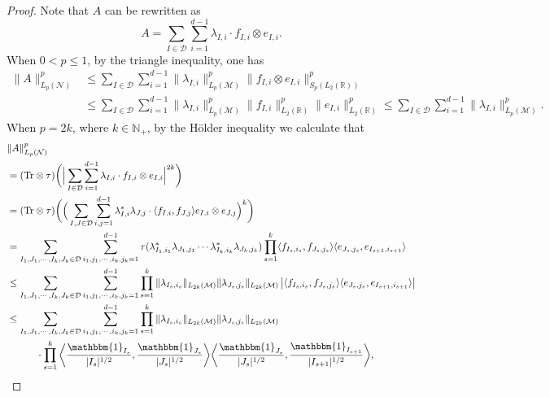 \documentclass[oneside,english,a4wide]{amsart}
\numberwithin{equation}{section}
\numberwithin{figure}{section}
\theoremstyle{plain}
\theoremstyle{plain}
\theoremstyle{definition}
\theoremstyle{plain}
\theoremstyle{remark}
\theoremstyle{definition}
\theoremstyle{remark}
\theoremstyle{definition}
\newcommand{\8}{\infty}
\begin{document}
\begin{proof}
	Note that $A$ can be rewritten as 
	$$A=\sum_{I\in \mathcal{D}}\sum_{i=1}^{d-1}\lambda_{I,i}\cdot f_{I,i}\otimes e_{I,i}. $$
	When $0<p\le 1$, by the triangle inequality, one has
	\begin{equation*}
		\begin{aligned}
			\|A\|^p_{L_p(\mathcal{N})}{}&\le \sum_{I\in\mathcal{D}}\sum_{i=1}^{d-1} \|\lambda_{I,i}\|^p_{L_p(\mathcal{M})}\|f_{I,i}\otimes e_{I,i}\|^p_{S_p(L_2(\mathbb{R}))}\\
			&\leq \sum_{I\in\mathcal{D}}\sum_{i=1}^{d-1} \|\lambda_{I,i}\|^p_{L_p(\mathcal{M})}\|f_{I,i}\|^p_{L_2(\mathbb{R})}\|e_{I,i}\|^p_{L_2(\mathbb{R})}\le\sum_{I\in\mathcal{D}}\sum_{i=1}^{d-1} \|\lambda_{I,i}\|^p_{L_p(\mathcal{M})}.
		\end{aligned}
	\end{equation*}
	When $p=2k$, where $k\in\mathbb{N}_+$, by the Hölder inequality we calculate that
	\begin{equation}\label{mp2}
		\begin{aligned}
			{}&\|A\|^p_{L_p(\mathcal{N})}\\
			&=(\mathrm{Tr}\otimes \tau) \biggl(\Big|\sum_{I\in\mathcal{D}}\sum_{i=1}^{d-1}\lambda_{I,i}\cdot f_{I,i}\otimes e_{I,i}\Big|^{2k}\biggr)\\
			&=(\mathrm{Tr}\otimes \tau) \biggl(\Big(\sum_{I,J\in\mathcal{D}}\sum_{i,j=1}^{d-1}\lambda_{I,i}^*\lambda_{J,j}\cdot \langle f_{I,i},f_{J,j}\rangle e_{I,i}\otimes e_{J,j}\Big)^{k}\biggr)\\
			&=\sum_{I_1,J_1,\cdots,I_k,J_k\in\mathcal{D}}\sum_{ i_1,j_1,\cdots,i_k,j_k=1}^{d-1} \tau(\lambda_{I_1,i_1}^*\lambda_{J_1,j_1}\cdots \lambda_{I_k,i_k}^*\lambda_{J_k,j_k}) \prod_{s=1}^k \langle f_{I_s,i_s},f_{J_s,j_s}\rangle \langle e_{J_s,j_s},e_{I_{s+1},i_{s+1}}\rangle\\
			&\le \sum_{I_1,J_1,\cdots,I_k,J_k\in\mathcal{D}} \sum_{ i_1,j_1,\cdots,i_k,j_k=1}^{d-1} \prod_{s=1}^k \|\lambda_{I_s,i_s}\|_{L_{2k}(\mathcal{M})}\|\lambda_{J_s,j_s}\|_{L_{2k}(\mathcal{M})}\left|\langle f_{I_s,i_s},f_{J_s,j_s}\rangle \langle e_{J_s,j_s},e_{I_{s+1},i_{s+1}}\rangle\right|\\
			&\leq \sum_{I_1,J_1,\cdots,I_k,J_k\in\mathcal{D}} \sum_{ i_1,j_1,\cdots,i_k,j_k=1}^{d-1} \prod_{s=1}^k \|\lambda_{I_s,i_s}\|_{L_{2k}(\mathcal{M})}\|\lambda_{J_s,j_s}\|_{L_{2k}(\mathcal{M})} \\
			&\quad\quad\quad\cdot\prod_{s=1}^k \bigg\langle \frac{\mathbbm{1}_{I_s}}{|I_s|^{1/2}},\frac{\mathbbm{1}_{J_s}}{|J_s|^{1/2}}\bigg\rangle \bigg\langle \frac{\mathbbm{1}_{J_s}}{|J_s|^{1/2}},\frac{\mathbbm{1}_{I_{s+1}}}{|I_{s+1}|^{1/2}}\bigg\rangle,

\end{aligned}
\end{equation}
\end{proof}
\end{document}
